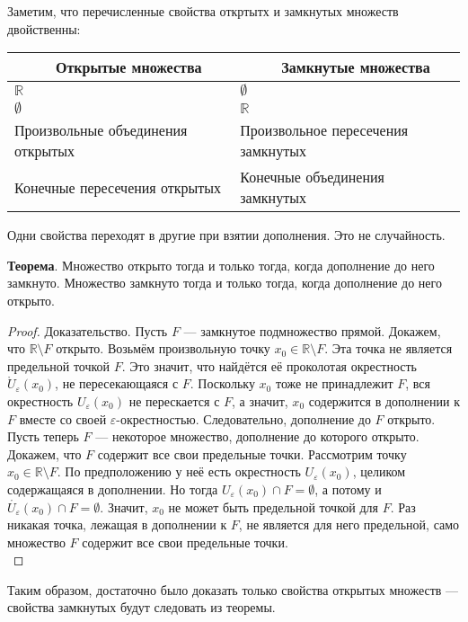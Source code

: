 \documentclass{report}
\begin{document}
Заметим, что перечисленные свойства откртытх и замкнутых множеств двойственны:

\begin{tabular}{|l|l|}\hline
\ \ \ \ \ \textbf{Открытые множества} & \ \ \ \ \ \textbf{Замкнутые множества} \\
\hline
$\mathbb{R}$ & $\emptyset$ \\ \hline
$\emptyset $ & $\mathbb{R}$ \\ \hline
Произвольные объединения открытых & Произвольное пересечения замкнутых \\ \hline
Конечные пересечения открытых & Конечные объединения замкнутых \\ \hline
\end{tabular}

Одни свойства переходят в другие при взятии дополнения. Это не случайность.

\textbf{Теорема}. Множество открыто тогда и только тогда, когда дополнение до него замкнуто. Множество замкнуто тогда и только тогда, когда дополнение до него открыто. \\

\begin{proof}
Доказательство. Пусть $F$ — замкнутое подмножество прямой. Докажем, что $\mathbb{R} \setminus F$ открыто. Возьмём произвольную точку $x_0 \in \mathbb{R} \setminus F$. Эта точка не является предельной точкой $F$. Это значит, что найдётся её проколотая окрестность $\mathring{U}_{\varepsilon}(x_0)$, не пересекающаяся с $F$. Поскольку $x_0$ тоже не принадлежит $F$, вся окрестность $U_{\varepsilon}(x_0)$ не перескается с $F$, а значит, $x_0$ содержится в дополнении к $F$ вместе со своей $\varepsilon$-окрестностью. Следовательно, дополнение до $F$ открыто.\\ 

Пусть теперь $F$ — некоторое множество, дополнение до которого открыто. Докажем, что $F$ содержит все свои предельные точки. Рассмотрим точку $x_0 \in \mathbb{R} \setminus F$. По предположению у неё есть окрестность $U_{\varepsilon}(x_0)$, целиком содержащаяся в дополнении. Но тогда $U_{\varepsilon}(x_0) \cap F = \emptyset$, а потому и $\mathring{U_{\varepsilon}}(x_0) \cap F = \emptyset$. Значит, $x_0$ не может быть предельной точкой для $F$. Раз никакая точка, лежащая в дополнении к $F$, не является для него предельной, само множество $F$ содержит все свои предельные точки.\\
\end{proof}
Таким образом, достаточно было доказать только свойства открытых множеств — свойства замкнутых будут следовать из теоремы.\\
\end{document}
